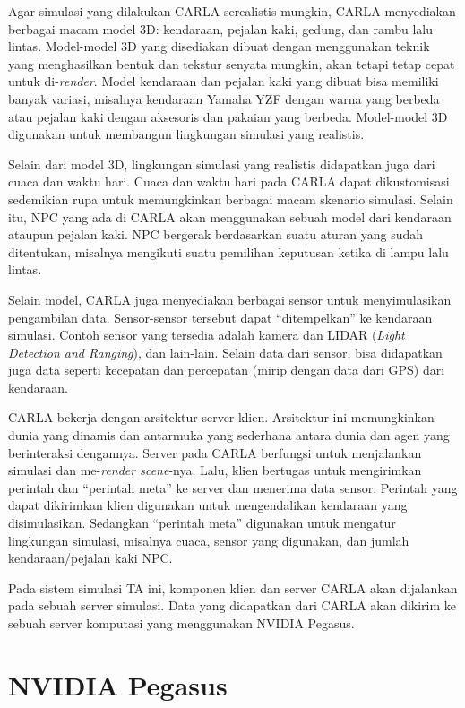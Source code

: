 Agar simulasi yang dilakukan CARLA serealistis mungkin, CARLA menyediakan
berbagai macam model 3D: kendaraan, pejalan kaki, gedung, dan rambu lalu lintas.
Model-model 3D yang disediakan dibuat dengan menggunakan teknik yang
menghasilkan bentuk dan tekstur senyata mungkin, akan tetapi tetap cepat untuk
di-\textit{render}. Model kendaraan dan pejalan kaki yang dibuat bisa memiliki
banyak variasi, misalnya kendaraan Yamaha YZF dengan warna yang berbeda atau
pejalan kaki dengan aksesoris dan pakaian yang berbeda. Model-model 3D
digunakan untuk membangun lingkungan simulasi yang realistis.

Selain dari model 3D, lingkungan simulasi yang realistis didapatkan juga dari
cuaca dan waktu hari. Cuaca dan waktu hari pada CARLA dapat dikustomisasi
se\-de\-mi\-ki\-an rupa untuk memungkinkan berbagai macam skenario simulasi.
Selain itu, NPC yang ada di CARLA akan menggunakan sebuah model dari kendaraan
ataupun pejalan kaki. NPC bergerak berdasarkan suatu aturan yang sudah
ditentukan, misalnya mengikuti suatu pemilihan keputusan ketika di lampu lalu
lintas.

Selain model, CARLA juga menyediakan berbagai sensor untuk menyimulasikan
pengambilan data. Sensor-sensor tersebut dapat ``ditempelkan'' ke kendaraan
simulasi. Contoh sensor yang tersedia adalah kamera dan LIDAR (\textit{Light
    Detection and Ranging}), dan lain-lain. Selain data dari sensor, bisa didapatkan
juga data seperti kecepatan dan percepatan (mirip dengan data dari GPS) dari
kendaraan.

CARLA bekerja dengan arsitektur server-klien. Arsitektur ini memungkinkan dunia
yang dinamis dan antarmuka yang sederhana antara dunia dan agen yang
berinteraksi dengannya. Server pada CARLA berfungsi untuk menjalankan simulasi
dan me-\textit{render scene}-nya. Lalu, klien bertugas untuk mengirimkan
perintah dan ``perintah meta'' ke server dan menerima data sensor. Perintah yang
dapat dikirimkan klien digunakan untuk mengendalikan kendaraan yang
disimulasikan. Sedangkan ``perintah meta'' digunakan untuk mengatur lingkungan
simulasi, misalnya cuaca, sensor yang digunakan, dan jumlah kendaraan/pejalan
kaki NPC.

Pada sistem simulasi TA ini, komponen klien dan server CARLA akan dijalankan
pada sebuah server simulasi. Data yang didapatkan dari CARLA akan dikirim ke
sebuah server komputasi yang menggunakan NVIDIA Pegasus.

\section{NVIDIA Pegasus}

